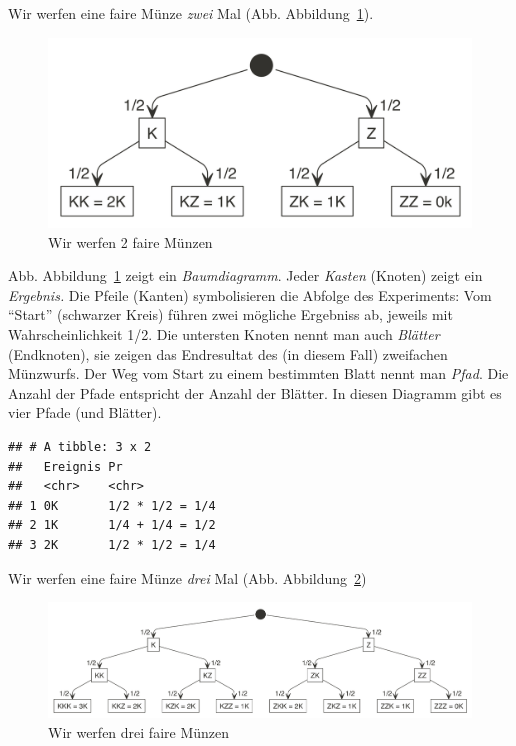 \documentclass[
  a4paper,
  DIV=11]{scrreprt}
\theoremstyle{definition}
\theoremstyle{remark}
\begin{document}
Wir werfen eine faire Münze \emph{zwei} Mal (Abb.
Abbildung~\ref{fig-2muenzen}).

\begin{figure}

{\centering \includegraphics{./img/muenz1.png}

}

\caption{\label{fig-2muenzen}Wir werfen 2 faire Münzen}

\end{figure}

Abb. Abbildung~\ref{fig-2muenzen} zeigt ein \emph{Baumdiagramm}. Jeder
\emph{Kasten} (Knoten) zeigt ein \emph{Ergebnis.} Die Pfeile (Kanten)
symbolisieren die Abfolge des Experiments: Vom ``Start'' (schwarzer
Kreis) führen zwei mögliche Ergebniss ab, jeweils mit Wahrscheinlichkeit
1/2. Die untersten Knoten nennt man auch \emph{Blätter} (Endknoten), sie
zeigen das Endresultat des (in diesem Fall) zweifachen Münzwurfs. Der
Weg vom Start zu einem bestimmten Blatt nennt man \emph{Pfad}. Die
Anzahl der Pfade entspricht der Anzahl der Blätter. In diesen Diagramm
gibt es vier Pfade (und Blätter).

\begin{verbatim}
## # A tibble: 3 x 2
##   Ereignis Pr             
##   <chr>    <chr>          
## 1 0K       1/2 * 1/2 = 1/4
## 2 1K       1/4 + 1/4 = 1/2
## 3 2K       1/2 * 1/2 = 1/4
\end{verbatim}

Wir werfen eine faire Münze \emph{drei} Mal (Abb.
Abbildung~\ref{fig-3muenzen})

\begin{figure}

{\centering \includegraphics{./img/muenz2.png}

}

\caption{\label{fig-3muenzen}Wir werfen drei faire Münzen}

\end{figure}
\end{document}
